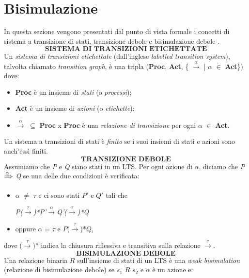 \documentclass[a4paper,11pt,twoside,openright]{report}
\begin{document}
\chapter{Bisimulazione}
In questa sezione vengono presentati dal punto di vista formale i concetti di sistema a transizione di stati, transizione debole e bisimulazione debole \cite{1}.\\
\[\textbf{SISTEMA DI TRANSIZIONI ETICHETTATE}\] Un \textit{sistema di transizioni etichettate} (dall'inglese \textit{labelled transition system}), talvolta chiamato \textit{transition graph}, è una tripla (\textbf{Proc}, \textbf{Act}, \{ $\xrightarrow{\alpha}$ | $\alpha$ $\in$ \textbf{Act}\}) dove:

\begin{itemize}
\item \textbf{Proc} è un insieme di \textit{stati} (o \textit{processi});

\item \textbf{Act} è un insieme di \textit{azioni} (o \textit{etichette});

\item $\xrightarrow{\alpha}$ $\subseteq$ \textbf{Proc} x \textbf{Proc} è una \textit{relazione di transizione} per ogni $\alpha$ $\in$ \textbf{Act}.
\end{itemize}

Un sistema a transizioni di stati è \textit{finito} se i suoi insiemi di stati e azioni sono anch'essi finiti.\\

\[\textbf{TRANSIZIONE DEBOLE}\]Assumiamo che \textit{P} e \textit{Q} siano stati in un LTS. Per ogni azione di $\alpha$, diciamo che \textit{P} $\xRightarrow{\alpha}$ \textit{Q} se una delle due condizioni è verificata:

\begin{itemize}
\item $\alpha$ $\neq$ $\tau$ e ci sono stati $P'$ e $Q'$ tali che\\
\centerline{\textit{P($\xrightarrow{\tau}$)*P'$\xrightarrow{\alpha}$Q'($\xrightarrow{\tau}$)*Q}}

\item oppure $\alpha$ = $\tau$ e $P$($\xrightarrow{\tau}$)*$Q$,
\end{itemize}

dove ($\xrightarrow{\tau}$)* indica la chiusura riflessiva e transitiva sulla relazione $\xrightarrow{\tau}$.\\

\[\textbf{BISIMULAZIONE DEBOLE}\] Una relazione binaria $R$ sull'insieme di stati di un LTS è una \textit{weak bisimulation} (relazione di bisimulazione debole) se $s_1$ $R$ $s_2$ e $\alpha$ è un azione e:
\end{document}
